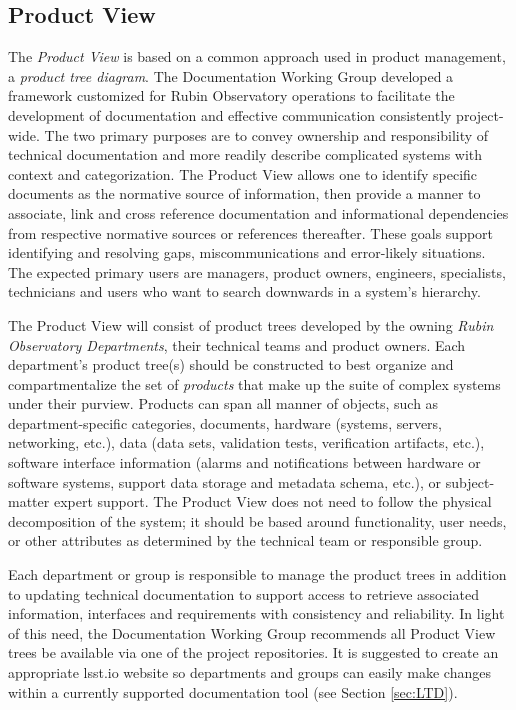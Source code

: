 \subsection{Product View}

The \emph{Product View} is based on a common approach used in product management, a \emph{product tree diagram}.
The Documentation Working Group developed a framework customized for Rubin Observatory operations to facilitate the development of documentation and effective communication consistently project-wide.
The two primary purposes are to convey ownership and responsibility of technical documentation and more readily describe complicated systems with context and categorization.
The Product View allows one to identify specific documents as the normative source of information, then provide a manner to associate, link and cross reference documentation and informational dependencies from respective normative sources or references thereafter.
These goals support identifying and resolving gaps, miscommunications and error-likely situations.
The expected primary users are managers, product owners, engineers, specialists, technicians and users who want to search downwards in a system's hierarchy.

The Product View will consist of product trees developed by the owning \emph{Rubin Observatory Departments}, their technical teams and product owners.
Each department's product tree(s) should be constructed to best organize and compartmentalize the set of \emph{products} that make up the suite of complex systems under their purview.
Products can span all manner of objects, such as department-specific categories, documents, hardware (systems, servers, networking, etc.), data (data sets, validation tests, verification artifacts, etc.), software interface information (alarms and notifications between hardware or software systems, support data storage and metadata schema, etc.), or subject-matter expert support.
The Product View does not need to follow the physical decomposition of the system; it should be based around functionality, user needs, or other attributes as determined by the technical team or responsible group.

Each department or group is responsible to manage the product trees in addition to updating technical documentation to support access to retrieve associated information, interfaces and requirements with consistency and reliability.
In light of this need, the Documentation Working Group recommends all Product View trees be available via one of the project repositories.
It is suggested to create an appropriate lsst.io website so departments and groups can easily make changes within a currently supported documentation tool (see Section \ref{sec:LTD}).

